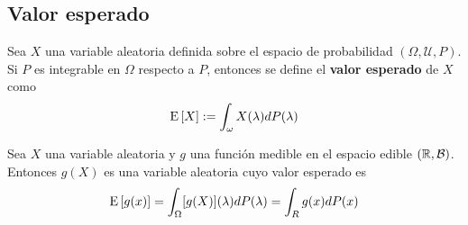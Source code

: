 

%
%

\subsection{Valor esperado}

\begin{definicion}
Sea $X$ una variable aleatoria definida sobre el espacio de probabilidad $(\Omega, \mathcal{U}, P)$. Si $P$ es integrable en $\Omega$ respecto a $P$, entonces se define el \textbf{valor esperado} de $X$ como
\begin{equation}
\mathrm{E}\left[ X \right] := \int_\omega X(\lambda) dP(\lambda)
\end{equation}
\end{definicion}

\begin{proposicion}
Sea $X$ una variable aleatoria y $g$ una función medible en el espacio edible $(\mathbb{R},\mathcal{B})$. Entonces $g(X)$ es una variable aleatoria cuyo valor esperado es
\begin{equation}
\mathrm{E}\left[ g(x) \right] = \int_\Omega [g(X)](\lambda) dP(\lambda) = \int_R g(x) dP(x)
\end{equation}
\end{proposicion}

